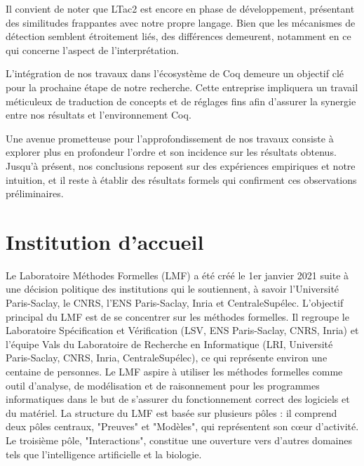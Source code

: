 \documentclass[french,titlepage]{article}
\begin{document}
Il convient de noter que LTac2 est encore en phase de développement, présentant des similitudes frappantes avec notre propre langage. Bien que les mécanismes de détection semblent étroitement liés, des différences demeurent, notamment en ce qui concerne l'aspect de l'interprétation.

L'intégration de nos travaux dans l'écosystème de Coq demeure un objectif clé pour la prochaine étape de notre recherche. Cette entreprise impliquera un travail méticuleux de traduction de concepts et de réglages fins afin d'assurer la synergie entre nos résultats et l'environnement Coq.

Une avenue prometteuse pour l'approfondissement de nos travaux consiste à explorer plus en profondeur l'ordre et son incidence sur les résultats obtenus. Jusqu'à présent, nos conclusions reposent sur des expériences empiriques et notre intuition, et il reste à établir des résultats formels qui confirment ces observations préliminaires.



\newpage
\appendix
\section{Institution d'accueil}
Le Laboratoire Méthodes Formelles (LMF) a été créé le 1er janvier 2021 suite à une décision politique des institutions qui le soutiennent, à savoir l'Université Paris-Saclay, le CNRS, l'ENS Paris-Saclay, Inria et CentraleSupélec. L'objectif principal du LMF est de se concentrer sur les méthodes formelles. Il regroupe le Laboratoire Spécification et Vérification (LSV, ENS Paris-Saclay, CNRS, Inria) et l'équipe Vals du Laboratoire de Recherche en Informatique (LRI, Université Paris-Saclay, CNRS, Inria, CentraleSupélec), ce qui représente environ une centaine de personnes.
Le LMF aspire à utiliser les méthodes formelles comme outil d'analyse, de modélisation et de raisonnement pour les programmes informatiques dans le but de s'assurer du fonctionnement correct des logiciels et du matériel.
La structure du LMF est basée sur plusieurs pôles : il comprend deux pôles centraux, "Preuves" et "Modèles", qui représentent son cœur d'activité. Le troisième pôle, "Interactions", constitue une ouverture vers d'autres domaines tels que l'intelligence artificielle et la biologie.



\end{document}
